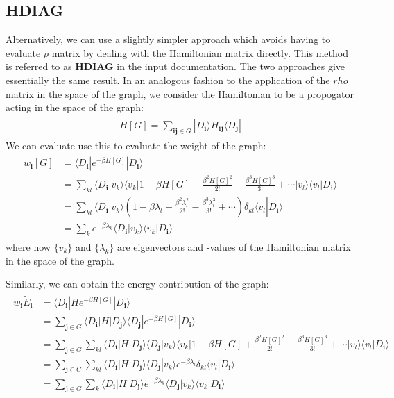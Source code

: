 \documentclass[openany,a4paper,10pt]{manual}
\newcommand{\bra}{\ensuremath{\langle}}
\newcommand{\ket}{\ensuremath{\rangle}}
\newcommand{\veci}{\ensuremath{\mathbf{i}}}
\newcommand{\vecj}{\ensuremath{\mathbf{j}}}
\begin{document}
\subsection{\textbf{HDIAG}}

Alternatively, we can use a slightly simpler approach which avoids having to evaluate
$\rho$ matrix by dealing with the Hamiltonian matrix directly.  This method is referred
to as \textbf{HDIAG} in the input documentation.  The two approaches give
essentially the same result.  In an analogous fashion to the application
of the $rho$ matrix in the space of the graph, we consider the Hamiltonian to be a propogator
acting in the space of the graph:
\begin{align}\begin{split}H[G] = \sum_{\veci\vecj \in G} |D_\veci \ket H_{\veci\vecj}\bra D_\vecj|\end{split}\end{align}
We can evaluate use this to evaluate the weight of the graph:
\begin{align}\begin{split}w_{\veci}[G] & = \bra D_{\veci} | e^{-\beta H[G]} | D_{\veci} \ket \\              & = \sum_{kl} \bra D_{\veci} | v_k \ket \bra v_k | 1 - \beta H[G] + \frac{\beta^2 H[G]^2}{2!} - \frac{\beta^3 H[G]^3}{3!} + \cdots | v_l \ket \bra v_l | D_{\veci} \ket \\              & = \sum_{kl} \bra D_{\veci} | v_k \ket (1 - \beta\lambda_l + \frac{\beta^2\lambda_l^2}{2!} - \frac{\beta^3\lambda_l^3}{3!} + \cdots) \delta_{kl} \bra v_l | D_{\veci} \ket \\              & =  \sum_k e^{-\beta\lambda_k} \bra D_{\veci} | v_k \ket \bra v_k | D_{\veci} \ket\end{split}\end{align}
where now $\{v_k\}$ and $\{\lambda_k\}$ are eigenvectors and
-values of the Hamiltonian matrix in the space of the graph.

Similarly, we can obtain the energy contribution of the graph:
\begin{align}\begin{split}w_{\veci}\tilde{E}_{\veci} & = \bra D_{\veci} | H e^{-\beta H[G]} | D_{\veci} \ket \\                            & = \sum_{\vecj \in G} \bra D_{\veci} | H | D_{\vecj} \ket \bra D_{\vecj} | e^{-\beta H[G]} | D_{\veci} \ket \\                            & = \sum_{\vecj \in G} \sum_{kl} \bra D_{\veci} | H | D_{\vecj} \ket \bra D_{\vecj} | v_k \ket \bra v_k | 1 - \beta H[G] + \frac{\beta^2 H[G]^2}{2!} - \frac{\beta^3 H[G]^3}{3!} + \cdots  | v_l \ket \bra v_l | D_{\veci} \ket \\                            & = \sum_{\vecj \in G} \sum_{kl}  \bra D_{\veci} | H | D_{\vecj} \ket \bra D_{\vecj} | v_k \ket e^{-\beta\lambda_l} \delta_{kl} \bra v_l | D_{\veci} \ket \\                            & = \sum_{\vecj \in G} \sum_{k} \bra D_{\veci} | H | D_{\vecj} \ket e^{-\beta\lambda_k} \bra D_{\vecj} | v_k \ket \bra v_k | D_{\veci} \ket\end{split}\end{align}
\resetcurrentobjects
\end{document}
